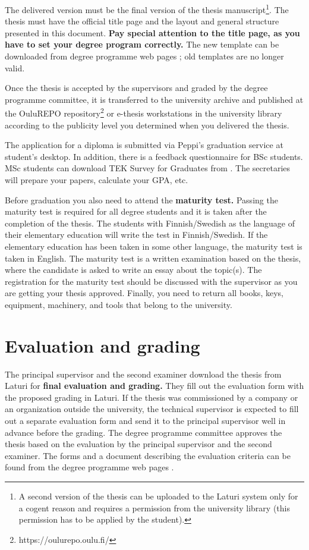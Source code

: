 The delivered version must be the final version of the thesis manuscript\footnote{A second version of the thesis can be uploaded to the Laturi system only for a cogent reason and requires a permission from the university library (this permission has to be applied by the student).}. The thesis must have the official title page and the layout and general structure presented in this document. \textbf{Pay special attention to the title page, as you have to set your degree program correctly.} The new template can be downloaded from degree programme web pages \cite{mscstudies}; old templates are no longer valid.

Once the thesis is accepted by the supervisors and graded by the degree programme committee, it is transferred to the university archive and published at the OuluREPO repository\footnote{https://oulurepo.oulu.fi/} or e-thesis workstations in the university library according to the publicity level you determined when you delivered the thesis.

The application for a diploma is submitted via Peppi's graduation service at student's desktop. In addition, there is a feedback questionnaire for BSc students. MSc students can download TEK Survey for Graduates from \cite{mscgraduation}. The secretaries will prepare your papers, calculate your GPA, etc. 

Before graduation you also need to attend the \textbf{maturity test.} Passing the maturity test is required for all degree students and it is taken after the completion of the thesis. The students with Finnish/Swedish as the language of their elementary education will write the test in Finnish/Swedish. If the elementary education has been taken in some other language, the maturity test is taken in English. The maturity test is a written examination based on the thesis, where the candidate is asked to write an essay about the topic(s). The registration for the maturity test should be discussed with the supervisor as you are getting your thesis approved. Finally, you need to return all books, keys, equipment, machinery, and tools that belong to the university.

\section{Evaluation and grading}

The principal supervisor and the second examiner download the thesis from Laturi for \textbf{final evaluation and grading.} They fill out the evaluation form with the proposed grading in Laturi. If the thesis was commissioned by a company or an organization outside the university, the technical supervisor is expected to fill out a separate evaluation form and send it to the principal supervisor well in advance before the grading. The degree programme committee approves the thesis based on the evaluation by the principal supervisor and the second examiner. The forms and a document describing the evaluation criteria can be found from the degree programme web pages \cite{mscstudies}.

